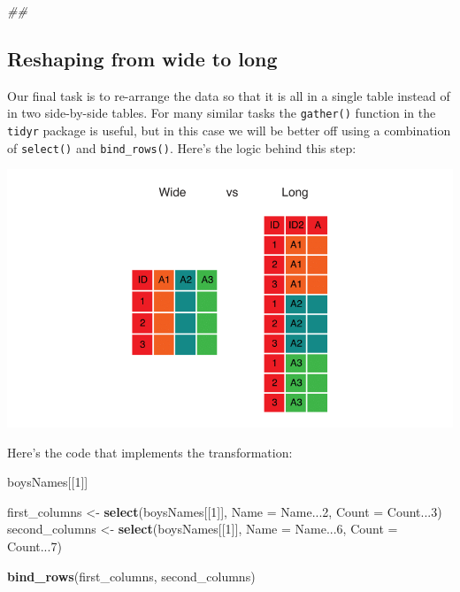 \documentclass[
]{book}
\newenvironment{Shaded}{\begin{snugshade}}{\end{snugshade}}
\newcommand{\CommentTok}[1]{\textcolor[rgb]{0.56,0.35,0.01}{\textit{#1}}}
\newcommand{\DataTypeTok}[1]{\textcolor[rgb]{0.13,0.29,0.53}{#1}}
\newcommand{\DecValTok}[1]{\textcolor[rgb]{0.00,0.00,0.81}{#1}}
\newcommand{\KeywordTok}[1]{\textcolor[rgb]{0.13,0.29,0.53}{\textbf{#1}}}
\newcommand{\NormalTok}[1]{#1}
\newcommand{\StringTok}[1]{\textcolor[rgb]{0.31,0.60,0.02}{#1}}
\begin{document}
\begin{Shaded}
\begin{Highlighting}[]
\CommentTok{## }
\end{Highlighting}
\end{Shaded}

\hypertarget{reshaping-from-wide-to-long}{%
\subsection{Reshaping from wide to long}\label{reshaping-from-wide-to-long}}

Our final task is to re-arrange the data so that it is all in a single
table instead of in two side-by-side tables. For many similar tasks
the \texttt{gather()} function in the \texttt{tidyr} package is useful, but in this
case we will be better off using a combination of \texttt{select()} and
\texttt{bind\_rows()}. Here's the logic behind this step:

\includegraphics{R/RDataWrangling/images/wide_vs_long.png}

Here's the code that implements the transformation:

\begin{Shaded}
\begin{Highlighting}[]
\NormalTok{boysNames[[}\DecValTok{1}\NormalTok{]]}

\NormalTok{first_columns <-}\StringTok{ }\KeywordTok{select}\NormalTok{(boysNames[[}\DecValTok{1}\NormalTok{]], }\DataTypeTok{Name =}\NormalTok{ Name...}\DecValTok{2}\NormalTok{, }\DataTypeTok{Count =}\NormalTok{ Count...}\DecValTok{3}\NormalTok{)}
\NormalTok{second_columns <-}\StringTok{ }\KeywordTok{select}\NormalTok{(boysNames[[}\DecValTok{1}\NormalTok{]], }\DataTypeTok{Name =}\NormalTok{ Name...}\DecValTok{6}\NormalTok{, }\DataTypeTok{Count =}\NormalTok{ Count...}\DecValTok{7}\NormalTok{)}

\KeywordTok{bind_rows}\NormalTok{(first_columns, second_columns)}
\end{Highlighting}
\end{Shaded}
\end{document}
